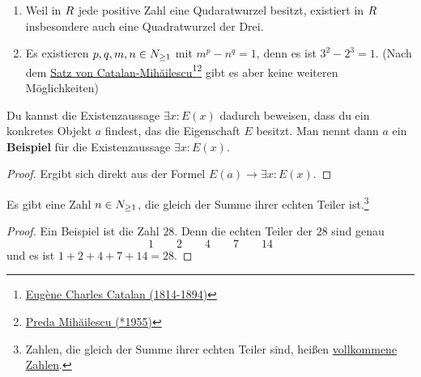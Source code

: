  
\begin{bsp}[*] \quad
    \begin{enumerate}
        \item Weil in $\relax R$ jede positive Zahl eine Qudaratwurzel besitzt, existiert in $\relax R$ insbesondere auch eine Quadratwurzel der Drei.
        \item Es existieren $p,q,m,n\in \relax N_{\ge 1}$ mit $m^p-n^q=1$, denn es ist $3^2-2^3=1$. (Nach dem \href{https://de.wikipedia.org/wiki/Catalansche_Vermutung}{Satz von Catalan-Mihăilescu}\footnote{\href{https://de.wikipedia.org/wiki/Eug\%C3\%A8ne_Charles_Catalan}{Eugène Charles Catalan (1814-1894)}}\footnote{\href{https://de.wikipedia.org/wiki/Preda_Mih\%C4\%83ilescu}{Preda Mihăilescu (*1955)}} gibt es aber keine weiteren Möglichkeiten)
    \end{enumerate}
\end{bsp}


\begin{satz} \label{beweisperbsp} 
    Du kannst die Existenzaussage $\exists x: E(x)$ dadurch beweisen, dass du ein konkretes Objekt $a$ findest, das die Eigenschaft $E$ besitzt. Man nennt dann $a$ ein \textbf{Beispiel} für die Existenzaussage $\exists x: E(x)$.
\end{satz}
\begin{proof}
    Ergibt sich direkt aus der Formel $E(a)\to\exists x:E(x)$.
\end{proof}


\begin{bsp}
    Es gibt eine Zahl $n\in \relax N_{\ge 1}$, die gleich der Summe ihrer echten Teiler ist.\footnote{Zahlen, die gleich der Summe ihrer echten Teiler sind, heißen \href{https://de.wikipedia.org/wiki/Vollkommene_Zahl}{vollkommene Zahlen}.}
\end{bsp}
\begin{proof}
    Ein Beispiel ist die Zahl $28$. Denn die echten Teiler der $28$ sind genau
        \[ 1 \qquad 2 \qquad 4 \qquad 7 \qquad 14 \]
    und es ist $1+2+4+7+14=28$.
\end{proof}

